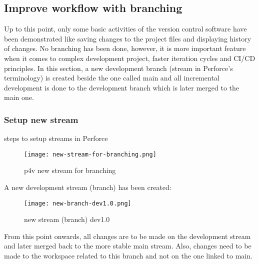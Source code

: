\subsection{Improve workflow with branching}
Up to this point, only some basic activities of the version control software have been
demonstrated like saving changes to the project files and displaying history of changes. No branching
has been done, however, it is more important feature when it comes to complex development project, faster iteration cycles and
CI/CD principles. In this section, a new development branch (stream in Perforce's terminology) is created beside the one
called main and all incremental development is done to the development branch which is later merged to the main one.
\subsubsection{Setup new stream}
steps to setup streams in Perforce
\begin{figure}[H]
    \centering
    \texttt{[image: new-stream-for-branching.png]}
      \caption{p4v new stream for branching}
      \label{fig:new-stream-for-branching}
\end{figure}
A new development stream (branch) has been created:
\begin{figure}[H]
    \centering
    \texttt{[image: new-branch-dev1.0.png]}
      \caption{new stream (branch) dev1.0}
      \label{fig:new-branch-dev1.0}
\end{figure}
From this point onwards, all changes are to be made on the development stream and later merged back to the more stable
main stream. Also, changes need to be made to the workspace related to this branch and not on the one linked to main.

